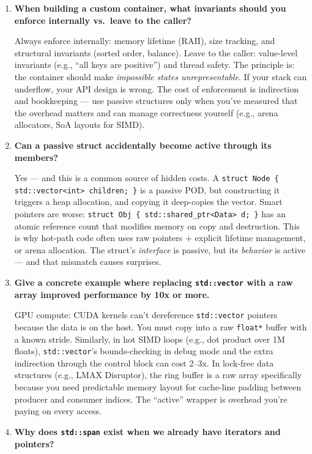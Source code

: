 \begin{enumerate}
\item \textbf{When building a custom container, what invariants should you enforce internally vs.\ leave to the caller?}

Always enforce internally: memory lifetime (RAII), size tracking, and structural invariants (sorted order, balance). Leave to the caller: value-level invariants (e.g., ``all keys are positive'') and thread safety. The principle is: the container should make \emph{impossible states unrepresentable}. If your stack can underflow, your API design is wrong. The cost of enforcement is indirection and bookkeeping --- use passive structures only when you've measured that the overhead matters and can manage correctness yourself (e.g., arena allocators, SoA layouts for SIMD).

\item \textbf{Can a passive struct accidentally become active through its members?}

Yes --- and this is a common source of hidden costs. A \texttt{struct Node \{ std::vector<int> children; \}} is a passive POD, but constructing it triggers a heap allocation, and copying it deep-copies the vector. Smart pointers are worse: \texttt{struct Obj \{ std::shared\_ptr<Data> d; \}} has an atomic reference count that modifies memory on copy and destruction. This is why hot-path code often uses raw pointers + explicit lifetime management, or arena allocation. The struct's \emph{interface} is passive, but its \emph{behavior} is active --- and that mismatch causes surprises.

\item \textbf{Give a concrete example where replacing \texttt{std::vector} with a raw array improved performance by 10x or more.}

GPU compute: CUDA kernels can't dereference \texttt{std::vector} pointers because the data is on the host. You must copy into a raw \texttt{float*} buffer with a known stride. Similarly, in hot SIMD loops (e.g., dot product over 1M floats), \texttt{std::vector}'s bounds-checking in debug mode and the extra indirection through the control block can cost 2--3x. In lock-free data structures (e.g., LMAX Disruptor), the ring buffer is a raw array specifically because you need predictable memory layout for cache-line padding between producer and consumer indices. The ``active'' wrapper is overhead you're paying on every access.

\item \textbf{Why does \texttt{std::span} exist when we already have iterators and pointers?}


\end{enumerate}

